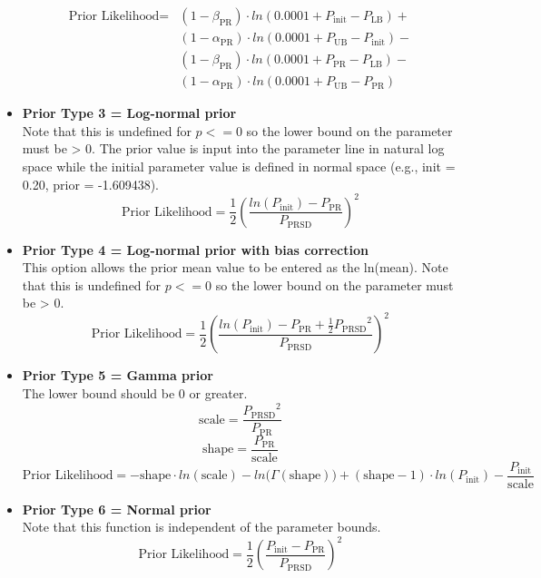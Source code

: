 \begin{itemize}
	\begin{equation}
		\begin{split}
\text{Prior Likelihood} = &(1 - \beta_\text{PR}) \cdot ln(0.0001 + P_\text{init} - P_\text{LB}) + \\
&(1 - \alpha_\text{PR}) \cdot ln(0.0001 + P_\text{UB} - P_\text{init}) - \\
&(1 - \beta_\text{PR}) \cdot ln(0.0001 + P_\text{PR} - P_\text{LB}) - \\
&(1 - \alpha_\text{PR}) \cdot ln(0.0001 + P_\text{UB} - P_\text{PR})
		\end{split}
	\end{equation}	

	
	\item \textbf{Prior Type 3 = Log-normal prior} \\ 
	Note that this is undefined for $p <= 0$ so the lower bound on the parameter must be > 0. The prior value is input into the parameter line in natural log space while the initial parameter value is defined in normal space (e.g., init = 0.20, prior = -1.609438).
	\begin{equation}
		\text{Prior Likelihood} = \frac{1}{2} \left(\frac{ln(P_\text{init})-P_\text{PR}}{P_\text{PRSD}}\right)^2
	\end{equation}
	
	\item \textbf{Prior Type 4 = Log-normal prior with bias correction} \\ 
	This option allows the prior mean value to be entered as the ln(mean). Note that this is undefined for $p <= 0$ so the lower bound on the parameter must be > 0.
	\begin{equation}
		\text{Prior Likelihood} = \frac{1}{2} \left(\frac{ln(P_\text{init})-P_\text{PR} + \frac{1}{2}{P_\text{PRSD}}^2}{P_\text{PRSD}}\right)^2
	\end{equation}
	
	\item \textbf{Prior Type 5 = Gamma prior} \\ 
	The lower bound should be 0 or greater.
	\begin{equation}
		\text{scale} = \frac{{P_\text{PRSD}}^2}{P_\text{PR}}
	\end{equation}
	\begin{equation}
		\text{shape} = \frac{P_\text{PR}}{\text{scale}}
	\end{equation}
	\begin{equation}
		\text{Prior Likelihood} = -\text{shape} \cdot ln(\text{scale}) - ln\big(\Gamma(\text{shape})\big) + (\text{shape} - 1) \cdot ln(P_\text{init}) - \frac{P_\text{init}}{\text{scale}}
	\end{equation}
	
	\item \textbf{Prior Type 6 = Normal prior} \\ 
	Note that this function is independent of the parameter bounds.
	\begin{equation}
		\text{Prior Likelihood} = \frac{1}{2} \left(\frac{P_\text{init} - P_\text{PR}}{P_\text{PRSD}}\right)^2
	\end{equation}
\end{itemize}



% 


\pagebreak